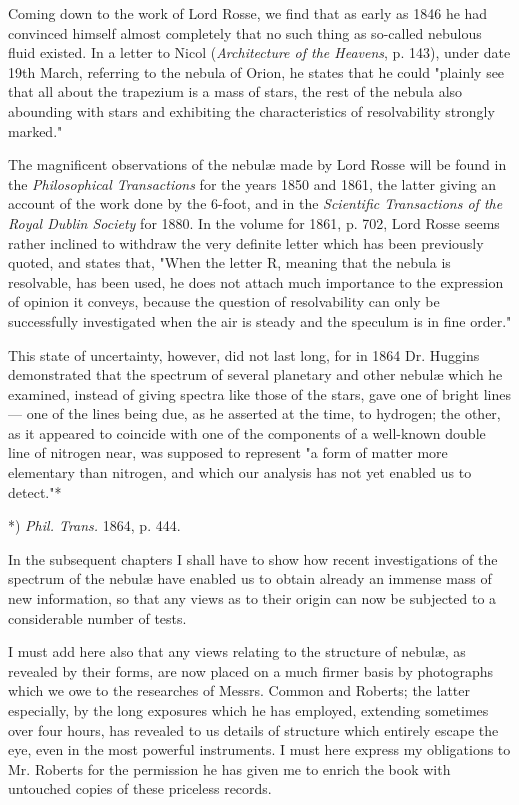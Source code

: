 \documentclass[a4paper, 12pt, oneside, polutonikogreek, english]{article}
\begin{document}
Coming down to the work of Lord Rosse, we find that as early as 1846 he had convinced himself almost completely that no such thing as so-called nebulous fluid existed. In a letter to Nicol (\emph{Architecture of the Heavens}, p. 143), under date 19th March, referring to the nebula of Orion, he states that he could "plainly see that all about the trapezium is a mass of stars, the rest of the nebula also abounding with stars and exhibiting the characteristics of resolvability strongly marked."

The magnificent observations of the nebulæ made by Lord Rosse will be found in the \emph{Philosophical Transactions} for the years 1850 and 1861, the latter giving an account of the work done by the 6-foot, and in the \emph{Scientific Transactions of the Royal Dublin Society} for 1880. In the volume for 1861, p. 702, Lord Rosse seems rather inclined to withdraw the very definite letter which has been previously quoted, and states that, "When the letter R, meaning that the nebula is resolvable, has been used, he does not attach much importance to the expression of opinion it conveys, because the question of resolvability can only be successfully investigated when the air is steady and the speculum is in fine order."

This state of uncertainty, however, did not last long, for in 1864 Dr. Huggins demonstrated that the spectrum of several planetary and other nebulæ which he examined, instead of giving spectra like those of the stars, gave one of bright lines --- one of the lines being due, as he asserted at the time, to hydrogen; the other, as it appeared to coincide with one of the components of a well-known double line of nitrogen near, was supposed to represent "a form of matter more elementary than nitrogen, and which our analysis has not yet enabled us to detect."*

*) \emph{Phil. Trans.} 1864, p. 444.

In the subsequent chapters I shall have to show how recent investigations of the spectrum of the nebulæ have enabled us to obtain already an immense mass of new information, so that any views as to their origin can now be subjected to a considerable number of tests.

I must add here also that any views relating to the structure of nebulæ, as revealed by their forms, are now placed on a much firmer basis by photographs which we owe to the researches of Messrs. Common and Roberts; the latter especially, by the long exposures which he has employed, extending sometimes over four hours, has revealed to us details of structure which entirely escape the eye, even in the most powerful instruments. I must here express my obligations to Mr. Roberts for the permission he has given me to enrich the book with untouched copies of these priceless records.
\end{document}
